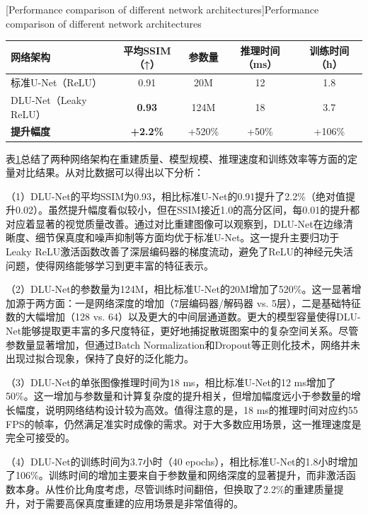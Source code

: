 {\begin{table}[!htbp]
    \centering
    [Performance comparison of different network architectures]{\enspace Performance comparison of different network architectures}
    \label{tab:comparison_networks}
    \footnotesize
    \setlength{\tabcolsep}{8pt}
    \renewcommand{\arraystretch}{1.3}
    \begin{tabular}{lcccc}
        \hline
        网络架构 & 平均SSIM（↑） & 参数量 & 推理时间（ms） & 训练时间（h） \\
        \hline
        标准U-Net（ReLU） & 0.91 & 20M & 12 & 1.8 \\
        DLU-Net（Leaky ReLU） & \textbf{0.93} & 124M & 18 & 3.7 \\
        \hline
        \textbf{提升幅度} & \textbf{+2.2\%} & +520\% & +50\% & +106\% \\
        \hline
    \end{tabular}
\end{table}

表\ref{tab:comparison_networks}总结了两种网络架构在重建质量、模型规模、推理速度和训练效率等方面的定量对比结果。从对比数据可以得出以下分析：

（1）DLU-Net的平均SSIM为0.93，相比标准U-Net的0.91提升了2.2\%（绝对值提升0.02）。虽然提升幅度看似较小，但在SSIM接近1.0的高分区间，每0.01的提升都对应着显著的视觉质量改善。通过对比重建图像可以观察到，DLU-Net在边缘清晰度、细节保真度和噪声抑制等方面均优于标准U-Net。这一提升主要归功于Leaky ReLU激活函数改善了深层编码器的梯度流动，避免了ReLU的神经元失活问题，使得网络能够学习到更丰富的特征表示。

（2）DLU-Net的参数量为124M，相比标准U-Net的20M增加了520\%。这一显著增加源于两方面：一是网络深度的增加（7层编码器/解码器 vs. 5层），二是基础特征数的大幅增加（128 vs. 64）以及更大的中间层通道数。更大的模型容量使得DLU-Net能够提取更丰富的多尺度特征，更好地捕捉散斑图案中的复杂空间关系。尽管参数量显著增加，但通过Batch Normalization和Dropout等正则化技术，网络并未出现过拟合现象，保持了良好的泛化能力。

（3）DLU-Net的单张图像推理时间为18 ms，相比标准U-Net的12 ms增加了50\%。这一增加与参数量和计算复杂度的提升相关，但增加幅度远小于参数量的增长幅度，说明网络结构设计较为高效。值得注意的是，18 ms的推理时间对应约55 FPS的帧率，仍然满足准实时成像的需求。对于大多数应用场景，这一推理速度是完全可接受的。

（4）DLU-Net的训练时间为3.7小时（40 epochs），相比标准U-Net的1.8小时增加了106\%。训练时间的增加主要来自于参数量和网络深度的显著提升，而非激活函数本身。从性价比角度考虑，尽管训练时间翻倍，但换取了2.2\%的重建质量提升，对于需要高保真度重建的应用场景是非常值得的。

}
